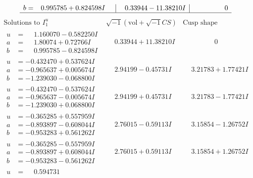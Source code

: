 \documentclass[1p]{elsarticle_modified}
\theoremstyle{definition}
\newcommand{\I}{\sqrt{-1}}
\begin{document}
$$\begin{array}{c|c|c}
\begin{aligned}
b &= \phantom{-}0.995785 + 0.824598 I\end{aligned}
 & \phantom{-}0.33944 - 11.38210 I & \phantom{-0.000000 } 0\\
 \hline 
 \end{array}$$\newpage$$\begin{array}{c|c|c}  
\text{Solutions to }I^u_{1}& \I (\text{vol} + \sqrt{-1}CS) & \text{Cusp shape}\\
 \hline 
\begin{aligned}
u &= \phantom{-}1.160070 - 0.582250 I \\
a &= \phantom{-}1.80074 + 0.72766 I \\
b &= \phantom{-}0.995785 - 0.824598 I\end{aligned}
 & \phantom{-}0.33944 + 11.38210 I & \phantom{-0.000000 } 0 \\ \hline\begin{aligned}
u &= -0.432470 + 0.537624 I \\
a &= -0.965637 + 0.005674 I \\
b &= -1.239030 - 0.068800 I\end{aligned}
 & \phantom{-}2.94199 - 0.45731 I & \phantom{-}3.21783 + 1.77421 I \\ \hline\begin{aligned}
u &= -0.432470 - 0.537624 I \\
a &= -0.965637 - 0.005674 I \\
b &= -1.239030 + 0.068800 I\end{aligned}
 & \phantom{-}2.94199 + 0.45731 I & \phantom{-}3.21783 - 1.77421 I \\ \hline\begin{aligned}
u &= -0.365285 + 0.557959 I \\
a &= -0.893897 - 0.608044 I \\
b &= -0.953283 + 0.561262 I\end{aligned}
 & \phantom{-}2.76015 - 0.59113 I & \phantom{-}3.15854 - 1.26752 I \\ \hline\begin{aligned}
u &= -0.365285 - 0.557959 I \\
a &= -0.893897 + 0.608044 I \\
b &= -0.953283 - 0.561262 I\end{aligned}
 & \phantom{-}2.76015 + 0.59113 I & \phantom{-}3.15854 + 1.26752 I \\ \hline\begin{aligned}
u &= \phantom{-}0.594731\phantom{ +0.000000I} \\

\end{aligned}
\end{array}$$
\end{document}
